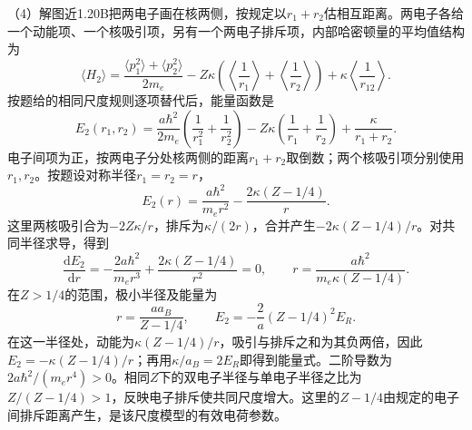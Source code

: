 \documentclass[UTF8,fontset=fandol,a4paper,11pt]{ctexart}
\begin{document}
（4）解图近1.20B把两电子画在核两侧，按规定以$r_1+r_2$估相互距离。两电子各给一个动能项、一个核吸引项，另有一个两电子排斥项，内部哈密顿量的平均值结构为
\[
\langle H_2\rangle=\frac{\langle p_1^2\rangle+\langle p_2^2\rangle}{2m_e}
-Z\kappa\left(\left\langle\frac1{r_1}\right\rangle+\left\langle\frac1{r_2}\right\rangle\right)
+\kappa\left\langle\frac1{r_{12}}\right\rangle.
\]
按题给的相同尺度规则逐项替代后，能量函数是
\[
E_2(r_1,r_2)=\frac{a\hbar^2}{2m_e}\left(\frac1{r_1^2}+\frac1{r_2^2}\right)
-Z\kappa\left(\frac1{r_1}+\frac1{r_2}\right)
+\frac{\kappa}{r_1+r_2}.
\]
电子间项为正，按两电子分处核两侧的距离$r_1+r_2$取倒数；两个核吸引项分别使用$r_1,r_2$。按题设对称半径$r_1=r_2=r$，
\[
E_2(r)=\frac{a\hbar^2}{m_er^2}-\frac{2\kappa(Z-1/4)}r.
\]
这里两核吸引合为$-2Z\kappa/r$，排斥为$\kappa/(2r)$，合并产生$-2\kappa(Z-1/4)/r$。对共同半径求导，得到
\[
\frac{\mathrm dE_2}{\mathrm dr}=-\frac{2a\hbar^2}{m_er^3}
+\frac{2\kappa(Z-1/4)}{r^2}=0,
\qquad r=\frac{a\hbar^2}{m_e\kappa(Z-1/4)}.
\]
在$Z>1/4$的范围，极小半径及能量为
\[
\boxed{r=\frac{a a_B}{Z-1/4}},\qquad
\boxed{E_2=-\frac{2}{a}(Z-1/4)^2E_R}.
\]
在这一半径处，动能为$\kappa(Z-1/4)/r$，吸引与排斥之和为其负两倍，因此$E_2=-\kappa(Z-1/4)/r$；再用$\kappa/a_B=2E_R$即得到能量式。二阶导数为$2a\hbar^2/(m_er^4)>0$。相同$Z$下的双电子半径与单电子半径之比为$Z/(Z-1/4)>1$，反映电子排斥使共同尺度增大。这里的$Z-1/4$由规定的电子间排斥距离产生，是该尺度模型的有效电荷参数。
\end{document}
